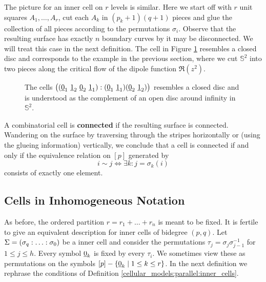 The picture for an inner cell on $r$ levels is similar.
Here we start off with $r$ unit squares $A_1, \ldots, A_r$, cut each $A_k$ in $(p_k+1)(q+1)$ pieces and glue the collection of all pieces according to the permutations $\sigma_i$.
Observe that the resulting surface has exactly $n$ boundary curves by it may be disconnected.
We will treat this case in the next definition.
The cell in Figure \ref{cellular_models:parallel:closed_disc} resembles a closed disc and corresponds to the example in the previous section, where we cut $\mathbb S^2$ into two pieces along the critical flow of the dipole function $\Re(z^2)$.
\begin{figure}[ht]
\centering
{}
\caption{\label{cellular_models:parallel:closed_disc}The cells $\big((\underline{\smash{0}}_1\ \underline{\smash{1}}_2\ \underline{\smash{0}}_2\ \underline{\smash{1}}_1): (\underline{\smash{0}}_1\ \underline{\smash{1}}_1)(\underline{\smash{0}}_2\ \underline{\smash{1}}_2)\big)$ resembles a closed disc and is understood as the complement of an open disc around infinity in $\mathbb S^2$.}
\end{figure}

\begin{defi}
    \label{cellular_models:parallel:connected}
    A combinatorial cell is {\bfseries connected} if the resulting surface is connected.
    Wandering on the surface by traversing through the stripes horizontally or (using the glueing information) vertically, we conclude that a cell is connected if and only if the equivalence relation on $[p]$ generated by
    \[
        i \sim j \iff \exists k : j = \sigma_k(i)
    \]
    consists of exactly one element.
\end{defi}

\subsection{Cells in Inhomogeneous Notation}
\label{cellular_models:parallel:cells_in_inhomogenous_notation}
As before, the ordered partition $r = r_1 + \ldots + r_n$ is meant to be fixed.
It is fertile to give an equivalent description for inner cells of bidegree $(p,q)$.
Let $\Sigma = \homogq$ be a inner cell and consider the permutations $\tau_j = \sigma_j \sigma_{j-1}^{-1}$ for $1 \le j \le h$.
Every symbol $\underline{\smash{0}}_k$ is fixed by every $\tau_i$.
We sometimes view these as permutations on the symbols $[p] - \{ \underline{\smash{0}}_k \mid 1 \le k \le r\}$.
In the next definition we rephrase the conditions of Definition \ref{cellular_models:parallel:inner_cells}.


